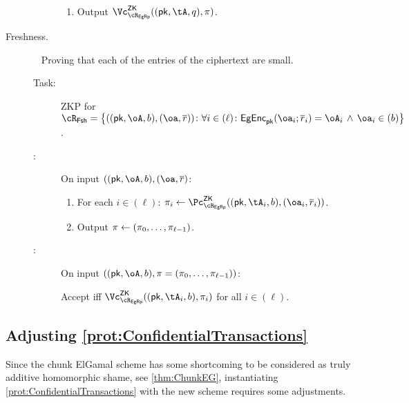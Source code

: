 \begin{description}
\begin{description}
\begin{enumerate}
		\item  Output $\vZK{\rEgRp}((\pk,\tA,q), \pi)$.
		
	\end{enumerate}
\end{description}
 


\item[Freshness.]  ~
Proving that each of the entries of the  ciphertext are small. 

\begin{description}
	\item[Task:] ZKP for $\rFsh =\rFshDef$.
	
	\item[\Pc:] On  input  $((\pk,\oA,b),(\oa,\orr)$:
	
	\begin{enumerate}
		\item For each $i\in (\ell)$: $\pi_i \asn \pZK{\rEgRp}((\pk,\tA_i,b), (\oa_i,\orr_i))$.
		\item Output $\pi \leftarrow (\pi_0,\ldots, \pi_{\ell-1})$.
	\end{enumerate}
	 
	 
	 	\item[\Vc:] On  input  $((\pk,\oA,b), \pi= (\pi_0,\ldots, \pi_{\ell-1}))$:
	 
	 Accept iff  $\vZK{\rEgRp}((\pk,\tA_i,b), \pi_i)$ for all $i\in (\ell)$.
	 
	 
\end{description}


\end{description}


\subsection{Adjusting  \cref{prot:ConfidentialTransactions}}\label{sec:ChanksEG:Adjusting}
Since the chunk ElGamal  scheme has some shortcoming to be considered as truly additive  homomorphic shame, see \cref{thm:ChunkEG}, instantiating \cref{prot:ConfidentialTransactions} with the new scheme  requires some adjustments.

